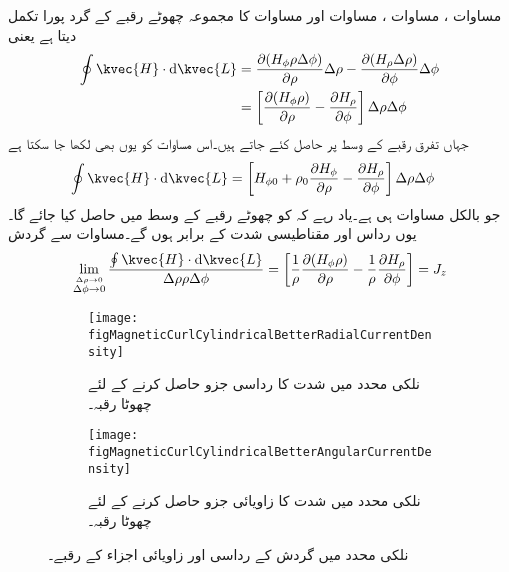 مساوات ، مساوات ، مساوات  اور مساوات  کا مجموعہ چھوٹے رقبے کے گرد پورا تکمل دیتا ہے یعنی
\begin{gather}
\begin{aligned}\label{مساوات_مقناطیسی_نلکی_پہلا_بند_تکمل_دوبارہ}
\oint \kvec{H} \cdot \dif \kvec{L}&=\frac{\partial (H_{\phi}\rho \Delta \phi)}{\partial \rho}\Delta \rho-\frac{\partial (H_{\rho} \Delta \rho)}{\partial \phi}\Delta \phi\\
&=\left[\frac{\partial (H_{\phi}\rho )}{\partial \rho}-\frac{\partial H_{\rho}}{\partial \phi}\right] \Delta \rho\Delta \phi
\end{aligned}
\end{gather}
جہاں تفرق رقبے کے وسط پر حاصل کئے جاتے ہیں۔اس مساوات کو یوں بھی لکھا جا سکتا ہے
\begin{align*}
\oint \kvec{H} \cdot \dif \kvec{L}&=\left[H_{\phi 0} +\rho_0 \frac{\partial H_{\phi}}{\partial \rho}-\frac{\partial H_{\rho}}{\partial \phi}\right] \Delta \rho\Delta \phi
\end{align*}
جو بالکل مساوات  ہی ہے۔یاد رہے کہ  کو چھوٹے رقبے کے وسط میں حاصل کیا جائے گا۔یوں رداس   اور مقناطیسی شدت  کے برابر ہوں گے۔مساوات  سے گردش
\begin{align}\label{مساوات_مقناطیسی_رداسی_ذ_گردش}
\lim_{\overset{\Delta \rho \to 0}{\Delta \phi \to 0}} \frac{\oint \kvec{H} \cdot \dif \kvec{L}}{\Delta \rho \rho \Delta \phi}=\left[\frac{1}{\rho}\frac{\partial (H_{\phi}\rho )}{\partial \rho}-\frac{1}{\rho}\frac{\partial H_{\rho}}{\partial \phi}\right] =J_z
\end{align}

\begin{figure}
\centering
\begin{subfigure}{0.5\textwidth}
\centering
\texttt{[image: figMagneticCurlCylindricalBetterRadialCurrentDensity]}
\caption{نلکی محدد میں شدت کا رداسی جزو حاصل کرنے کے لئے چھوٹا رقبہ۔}
\end{subfigure}%
%
\begin{subfigure}{0.5\textwidth}
\centering
\texttt{[image: figMagneticCurlCylindricalBetterAngularCurrentDensity]}
\caption{نلکی محدد میں شدت کا زاویائی جزو حاصل کرنے کے لئے چھوٹا رقبہ۔}
\end{subfigure}%
\caption{نلکی محدد میں گردش کے رداسی اور زاویائی اجزاء کے رقبے۔}
\label{شکل_مقناطیسی_نلکی_رداسی}
\end{figure}

